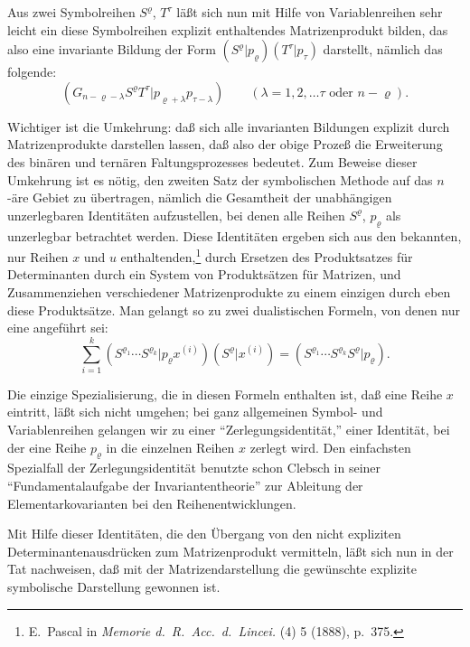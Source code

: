 \documentclass[12pt,a4paper]{article}
\begin{document}
Aus zwei Symbolreihen $S^{\varrho}$, $T^{\tau}$ läßt sich nun mit Hilfe von Variablenreihen sehr leicht ein diese Symbolreihen explizit enthaltendes Matrizenprodukt bilden, das also eine invariante Bildung der Form $(S^{\varrho} | p_{\varrho})(T^{\tau} | p_{\tau})$ darstellt, nämlich das folgende:
\begin{equation}\tag{1}
(G_{n-\varrho-\lambda} S^{\varrho} T^{\tau} | p_{\varrho+\lambda} p_{\tau-\lambda}) \qquad (\lambda = 1, 2, \ldots \tau \text{ oder } n-\varrho).
\end{equation}

Wichtiger ist die Umkehrung: daß sich alle invarianten Bildungen explizit durch Matrizenprodukte darstellen lassen, daß also der obige Prozeß die Erweiterung des binären und ternären Faltungsprozesses bedeutet. Zum Beweise dieser Umkehrung ist es nötig, den zweiten Satz der symbolischen Methode auf das $n$-äre Gebiet zu übertragen, nämlich die Gesamtheit der unabhängigen unzerlegbaren Identitäten aufzustellen, bei denen alle Reihen $S^{\varrho}$, $p_{\varrho}$ als unzerlegbar betrachtet werden. Diese Identitäten ergeben sich aus den bekannten, nur Reihen $x$ und $u$ enthaltenden,\footnote{E.\ Pascal in \textit{Memorie d.\ R.\ Acc.\ d.\ Lincei.} (4) 5 (1888), p.~375.} durch Ersetzen des Produktsatzes für Determinanten durch ein System von Produktsätzen für Matrizen, und Zusammenziehen verschiedener Matrizenprodukte zu einem einzigen durch eben diese Produktsätze. Man gelangt so zu zwei dualistischen Formeln, von denen nur eine angeführt sei:
\begin{equation}\tag{2}
\sum_{i=1}^{k} (S^{\varrho_{1}} \cdots S^{\varrho_{k}} | p_{\varrho} x^{(i)}) (S^{\varrho} | x^{(i)}) = (S^{\varrho_{1}} \cdots S^{\varrho_{k}} S^{\varrho} | p_{\varrho}).
\end{equation}

Die einzige Spezialisierung, die in diesen Formeln enthalten ist, daß eine Reihe $x$ eintritt, läßt sich nicht umgehen; bei ganz allgemeinen Symbol- und Variablenreihen gelangen wir zu einer ``Zerlegungsidentität,'' einer Identität, bei der eine Reihe $p_{\varrho}$ in die einzelnen Reihen $x$ zerlegt wird. Den einfachsten Spezialfall der Zerlegungsidentität benutzte schon Clebsch in seiner ``Fundamentalaufgabe der Invariantentheorie'' zur Ableitung der Elementarkovarianten bei den Reihenentwicklungen.

Mit Hilfe dieser Identitäten, die den Übergang von den nicht expliziten Determinantenausdrücken zum Matrizenprodukt vermitteln, läßt sich nun in der Tat nachweisen, daß mit der Matrizendarstellung die gewünschte explizite symbolische Darstellung gewonnen ist.
\end{document}
